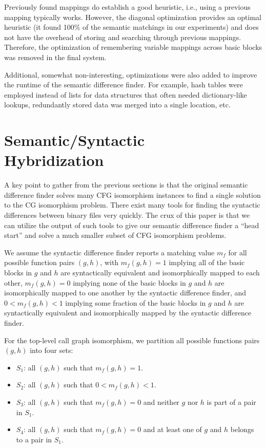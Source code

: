 \documentclass[11pt,twocolumn]{article}
\begin{document}
Previously found mappings do establish a good heuristic, i.e., using a previous mapping typically works.  However, the diagonal optimization provides an optimal heuristic (it found 100\% of the semantic matchings in our experiments) and does not have the overhead of storing and searching through previous mappings.  Therefore, the optimization of remembering variable mappings across basic blocks was removed in the final system.

Additional, somewhat non-interesting, optimizations were also added to improve the runtime of the semantic difference finder.  For example, hash tables were employed instead of lists for data structures that often needed dictionary-like lookups, redundantly stored data was merged into a single location, etc.

\section{Semantic/Syntactic \\ Hybridization}

A key point to gather from the previous sections is that the original semantic difference finder solves many CFG isomorphism instances to find a single solution to the CG isomorphism problem.   
There exist many tools for finding the syntactic differences between binary files very quickly.  The crux of this paper is that we can utilize the output of such tools to give our semantic difference finder a ``head start'' and solve a much smaller subset of CFG isomorphism problems.


We assume the syntactic difference finder reports a matching value $m_f$ for all possible function pairs $(g, h)$, with $m_f(g,h)=1$ implying all of the basic blocks in $g$ and $h$ are syntactically equivalent and isomorphically mapped to each other, $m_f(g,h)=0$ implying none of the basic blocks in $g$ and $h$ are isomorphically mapped to one another by the syntactic difference finder, and $0 < m_f(g,h) < 1$ implying some fraction of the basic blocks in $g$ and $h$ are syntactically equivalent and isomorphically mapped by the syntactic difference finder. 

For the top-level call graph isomorphism, we partition all possible functions pairs $(g,h) $ into four sets: 
\begin{itemize}
\item $S_1$: all $(g,h)$ such that $m_f(g,h) = 1$.
\item $S_2$: all $(g,h)$ such that $0 < m_f(g,h) < 1$.
\item $S_3$: all $(g,h)$ such that $m_f(g,h) = 0$ and neither $g$ nor $h$ is part of a pair in $S_1$.
\item $S_4$: all $(g,h)$ such that $m_f(g,h) = 0$ and at least one of $g$ and $h$ belongs to a pair in $S_1$.
\end{itemize}
\end{document}
